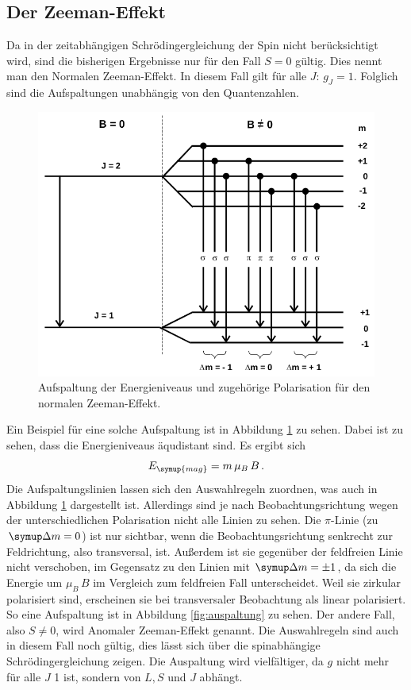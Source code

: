 \documentclass[
  bibliography=totoc,     %
  captions=tableheading,  %
  titlepage=firstiscover, %
]{scrartcl}
\begin{document}
\subsection{Der Zeeman-Effekt}
%
Da in der zeitabhängigen Schrödingergleichung der Spin nicht berücksichtigt wird,
sind die bisherigen Ergebnisse nur für den Fall $S = 0$ gültig. Dies nennt man
den Normalen Zeeman-Effekt. In diesem Fall gilt für
alle $J$: $g_J = 1$. Folglich sind die Aufspaltungen unabhängig von den
Quantenzahlen.
\begin{figure}
  \centering
  \includegraphics[scale=0.4]{normal.png}
  \caption{Aufspaltung der Energieniveaus und zugehörige Polarisation für den
  normalen Zeeman-Effekt. \cite{anleitung}}
  \label{fig:1}
\end{figure}
Ein Beispiel für eine solche Aufspaltung ist in Abbildung \ref{fig:1} zu sehen.
Dabei ist zu sehen, dass die Energieniveaus äqudistant sind. Es ergibt sich
\begin{equation}
  E_{\symup{mag}}= m \, \mu_B \, B \, .
  \label{eqn:10}
\end{equation}
Die Aufspaltungslinien lassen sich den Auswahlregeln zuordnen, was auch in
Abbildung \ref{fig:1} dargestellt ist. Allerdings sind je nach Beobachtungsrichtung
wegen der unterschiedlichen Polarisation nicht alle Linien zu sehen. Die $\pi$-Linie
(zu $\symup \Delta m = 0$) ist nur sichtbar, wenn die Beobachtungsrichtung
senkrecht zur Feldrichtung, also transversal, ist. Außerdem ist sie gegenüber
der feldfreien Linie nicht verschoben, im Gegensatz zu den Linien mit $\symup \Delta m = \pm 1$,
da sich die Energie um $\mu_B \, B$ im Vergleich zum feldfreien Fall unterscheidet.
Weil sie zirkular polarisiert sind, erscheinen sie bei transversaler Beobachtung als
linear polarisiert. So eine Aufspaltung ist in Abbildung \ref{fig:auspaltung} zu sehen.
Der andere Fall, also $S \neq 0$, wird Anomaler Zeeman-Effekt genannt.
Die Auswahlregeln sind auch in diesem Fall noch gültig, dies lässt
sich über die spinabhängige Schrödingergleichung zeigen. Die Auspaltung wird
vielfältiger, da $g$ nicht mehr für alle $J$ 1 ist, sondern von $L, S$ und $J$
abhängt.
\end{document}
